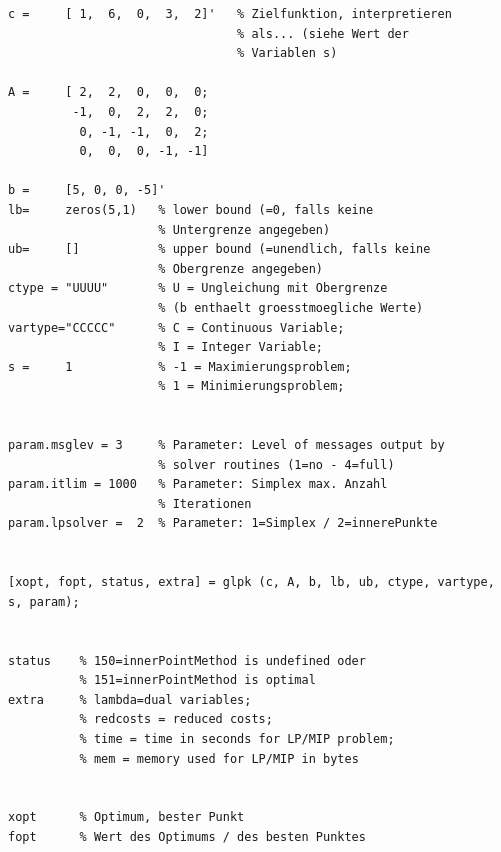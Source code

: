 \begin{refsection}
\begin{lstlisting}[style=Matlab]
c =     [ 1,  6,  0,  3,  2]'   % Zielfunktion, interpretieren
                                % als... (siehe Wert der
                                % Variablen s)

A =     [ 2,  2,  0,  0,  0;
         -1,  0,  2,  2,  0;
          0, -1, -1,  0,  2;
          0,  0,  0, -1, -1]

b =     [5, 0, 0, -5]'
lb=     zeros(5,1)   % lower bound (=0, falls keine
                     % Untergrenze angegeben)
ub=     []           % upper bound (=unendlich, falls keine
                     % Obergrenze angegeben)
ctype = "UUUU"       % U = Ungleichung mit Obergrenze
                     % (b enthaelt groesstmoegliche Werte)
vartype="CCCCC"      % C = Continuous Variable;
                     % I = Integer Variable;
s =     1            % -1 = Maximierungsproblem;
                     % 1 = Minimierungsproblem;

        
param.msglev = 3     % Parameter: Level of messages output by
                     % solver routines (1=no - 4=full)
param.itlim = 1000   % Parameter: Simplex max. Anzahl
                     % Iterationen
param.lpsolver =  2  % Parameter: 1=Simplex / 2=innerePunkte

          
[xopt, fopt, status, extra] = glpk (c, A, b, lb, ub, ctype, vartype, s, param);


status    % 150=innerPointMethod is undefined oder
          % 151=innerPointMethod is optimal
extra     % lambda=dual variables;
          % redcosts = reduced costs; 
          % time = time in seconds for LP/MIP problem; 
          % mem = memory used for LP/MIP in bytes

		
xopt      % Optimum, bester Punkt	
fopt      % Wert des Optimums / des besten Punktes
\end{lstlisting}

\printbibliography[heading=subbibliography]
\end{refsection}


